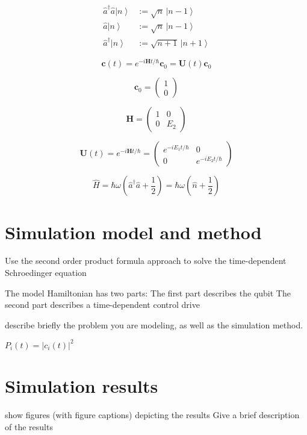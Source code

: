 \documentclass[journal]{IEEEtran} %
\begin{document}
\begin{align}
\hat a^\dagger \hat a\left|n\right\rangle&:=\sqrt{n}\,\left|n-1\right\rangle\\
\hat a\left|n\right\rangle&:=\sqrt{n}\,\left|n-1\right\rangle\\
\hat a^\dagger\left|n\right\rangle&:=\sqrt{n+1}\,\left|n+1\right\rangle
\end{align}

$$
\mathbf{c}(t)=e^{-i\mathbf{H}t/\hbar} \mathbf{c}_0=\mathbf{U}(t)\mathbf{c}_0
$$


$$
\mathbf{c}_0= \begin{pmatrix} 1\\ 0 \end{pmatrix} 
$$


$$
\mathbf{H} = \begin{pmatrix} 1 & 0\\ 0 & E_2 \end{pmatrix}
$$

$$
\mathbf{U}(t) = e^{-i\mathbf{H}t/\hbar} = \begin{pmatrix} e^{-iE_1t/\hbar} & 0\\ 0 & e^{-iE_2t/\hbar} \end{pmatrix}
$$

$$ \hat H=\hbar\omega\left(\hat a^\dagger\hat a+\frac{1}{2}\right) =\hbar\omega\left(\hat n+\frac{1}{2}\right) $$

\section{Simulation model and method}

Use the second order product formula approach to solve the time-dependent Schroedinger equation

The model Hamiltonian has two parts: The first part describes the qubit
The second part describes a time-dependent control drive

describe briefly the problem you are modeling, as well as the simulation method.

$P_i(t)=|c_i(t)|^2$

\section{Simulation results}

show figures (with figure captions) depicting the results
Give a brief description of the results
\end{document}
